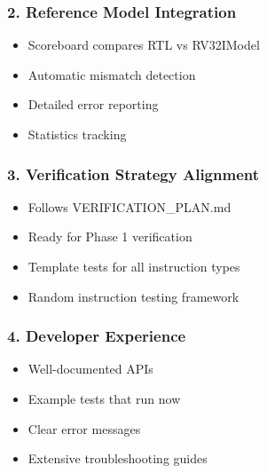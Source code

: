 \subsubsection{2. Reference Model Integration}\label{cr:app:archive-cocotb-setup-summary:2-reference-model-integration}

\begin{record}

\begin{itemize}
\tightlist
\item
  \ok{} Scoreboard compares RTL vs RV32IModel
\item
  \ok{} Automatic mismatch detection
\item
  \ok{} Detailed error reporting
\item
  \ok{} Statistics tracking
\end{itemize}

\end{record}

\subsubsection{3. Verification Strategy Alignment}\label{cr:app:archive-cocotb-setup-summary:3-verification-strategy-alignment}

\begin{record}

\begin{itemize}
\tightlist
\item
  \ok{} Follows VERIFICATION\_\allowbreak{}PLAN.md
\item
  \ok{} Ready for Phase 1 verification
\item
  \ok{} Template tests for all instruction types
\item
  \ok{} Random instruction testing framework
\end{itemize}

\end{record}

\subsubsection{4. Developer Experience}\label{cr:app:archive-cocotb-setup-summary:4-developer-experience}

\begin{record}

\begin{itemize}
\tightlist
\item
  \ok{} Well-documented APIs
\item
  \ok{} Example tests that run now
\item
  \ok{} Clear error messages
\item
  \ok{} Extensive troubleshooting guides
\end{itemize}

\end{record}


